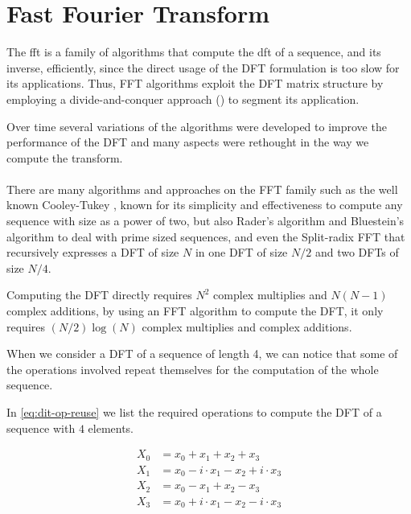 \documentclass[
  oneside,
  11pt, a4paper,
  footinclude=true,
  headinclude=true,
  cleardoublepage=empty
]{scrbook}
\begin{document}
\section{Fast Fourier Transform} \label{sec:fast-fourier-transform}

The \acrfull{fft} is a family of algorithms that compute the \acrfull{dft} of a sequence, and its inverse, efficiently, since the direct usage of the DFT formulation is too slow for its applications. Thus, FFT algorithms exploit the DFT matrix structure by employing a divide-and-conquer approach (\cite{chu1999inside}) to segment its application.

Over time several variations of the algorithms were developed to improve the performance of the DFT and many aspects were rethought in the way we compute the transform.

\paragraph{}
There are many algorithms and approaches on the FFT family such as the well known Cooley-Tukey \cite{cooley1965algorithm}, known for its simplicity and effectiveness to compute any sequence with size as a power of two, but also Rader's algorithm \cite{rader1968discrete} and Bluestein's algorithm \cite{bluestein1970linear} to deal with prime sized sequences, and even the Split-radix FFT \cite{yavne1968economical} that recursively expresses a DFT of size \(N\) in one DFT of size \(N/2\) and two DFTs of size \(N/4\).
\newline


Computing the DFT directly requires $N^{2}$ complex multiplies and $N (N-1)$ complex additions, by using an FFT algorithm to compute the DFT, it only requires $(N/2)\log{(N)}$ complex multiplies and complex additions.

When we consider a DFT of a sequence of length 4, we can notice that some of the operations involved repeat themselves for the computation of the whole sequence.

In \autoref{eq:dit-op-reuse} we list the required operations to compute the DFT of a sequence with $4$ elements. 

\begin{equation} \label{eq:dit-op-reuse}
    \begin{split}
    X_{0} &= x_{0} + x_{1} + x_{2} + x_{3} \\
    X_{1} &= x_{0} - i \cdot x_{1} - x_{2} + i \cdot x_{3} \\
    X_{2} &= x_{0} - x_{1} + x_{2} - x_{3} \\
    X_{3} &= x_{0} + i \cdot x_{1} - x_{2} - i \cdot x_{3} \\
    \end{split}
\end{equation}
\end{document}
